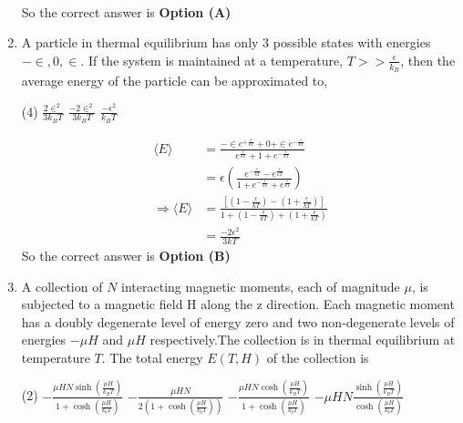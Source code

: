 \begin{enumerate}
\begin{answer}
\begin{align*}
		\end{align*}
		So the correct answer is \textbf{Option (A)}
	\end{answer}	
	\item A particle in thermal equilibrium has only 3 possible states with energies $-\in, 0, \in .$ If the system is maintained at a temperature, $T>>\frac{\epsilon}{k_{B}}$, then the average energy of the particle can be approximated to,
	{}
	\begin{tasks}(4)
		\task[\textbf{A.}] $\frac{2 \in^{2}}{3 k_{B} T}$
		\task[\textbf{B.}] $\frac{-2 \in^{2}}{3 k_{B} T}$
		\task[\textbf{C.}] $\frac{-\epsilon^{2}}{k_{B} T}$
	\end{tasks}
	\begin{answer}
		\begin{align*}
		\langle E\rangle&=\frac{-\in e^{+\frac{\epsilon}{k T}}+0+\in e^{-\frac{\epsilon}{k T}}}{e^{\frac{\epsilon}{k T}}+1+e^{-\frac{\epsilon}{k T}}}\\&=\epsilon\left(\frac{e^{-\frac{\epsilon}{k T}}-e^{\frac{\epsilon}{k T}}}{1+e^{-\frac{\epsilon}{k T}}+e^{\frac{\epsilon}{k T}}}\right)\\
		\Rightarrow\langle E\rangle&=\frac{\left[\left(1-\frac{\epsilon}{k T}\right)-\left(1+\frac{\epsilon}{k T}\right)\right]}{1+\left(1-\frac{\epsilon}{k T}\right)+\left(1+\frac{\epsilon}{k T}\right)}\\&=\frac{-2 \epsilon^{2}}{3 k T}
		\end{align*}
		So the correct answer is \textbf{Option (B)}
	\end{answer}	
	\item A collection of $N$ interacting magnetic moments, each of magnitude $\mu$, is subjected to a magnetic field $\mathrm{H}$ along the $\mathrm{z}$ direction. Each magnetic moment has a doubly degenerate level of energy zero and two non-degenerate levels of energies $-\mu H$ and $\mu H$ respectively.The collection is in thermal equilibrium at temperature $T$. The total energy $E(T, H)$ of the collection is
	{}
	\begin{tasks}(2)
		\task[\textbf{A.}] $-\frac{\mu H N \sinh \left(\frac{\mu H}{k_{B} T}\right)}{1+\cosh \left(\frac{\mu H}{k_{b} T}\right)}$
		\task[\textbf{B.}] $-\frac{\mu H N}{2\left(1+\cosh \left(\frac{\mu H}{k_{b} T}\right)\right)}$
		\task[\textbf{C.}] $-\frac{\mu H N \cosh \left(\frac{\mu H}{k_{B} T}\right)}{1+\cosh \left(\frac{\mu H}{k_{b} T}\right)}$
		\task[\textbf{D.}] $-\mu H N \frac{\sinh \left(\frac{\mu H}{k_{B} T}\right)}{\cosh \left(\frac{\mu H}{k_{b} T}\right)}$

\end{tasks}
\end{enumerate}
